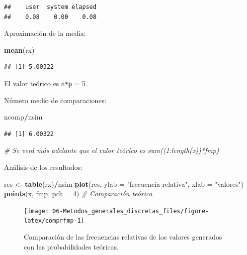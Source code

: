 \documentclass[]{book}
\newenvironment{Shaded}{\begin{snugshade}}{\end{snugshade}}
\newcommand{\KeywordTok}[1]{\textcolor[rgb]{0.13,0.29,0.53}{\textbf{#1}}}
\newcommand{\DataTypeTok}[1]{\textcolor[rgb]{0.13,0.29,0.53}{#1}}
\newcommand{\DecValTok}[1]{\textcolor[rgb]{0.00,0.00,0.81}{#1}}
\newcommand{\StringTok}[1]{\textcolor[rgb]{0.31,0.60,0.02}{#1}}
\newcommand{\CommentTok}[1]{\textcolor[rgb]{0.56,0.35,0.01}{\textit{#1}}}
\newcommand{\OperatorTok}[1]{\textcolor[rgb]{0.81,0.36,0.00}{\textbf{#1}}}
\newcommand{\NormalTok}[1]{#1}
\theoremstyle{definition}
\theoremstyle{definition}
\theoremstyle{definition}
\theoremstyle{remark}
\begin{document}
\begin{verbatim}
##    user  system elapsed 
##    0.08    0.00    0.08
\end{verbatim}

Aproximación de la media:

\begin{Shaded}
\begin{Highlighting}[]
\KeywordTok{mean}\NormalTok{(rx)}
\end{Highlighting}
\end{Shaded}

\begin{verbatim}
## [1] 5.00322
\end{verbatim}

El valor teórico es \texttt{n*p} = 5.

Número medio de comparaciones:

\begin{Shaded}
\begin{Highlighting}[]
\NormalTok{ncomp}\OperatorTok{/}\NormalTok{nsim}
\end{Highlighting}
\end{Shaded}

\begin{verbatim}
## [1] 6.00322
\end{verbatim}

\begin{Shaded}
\begin{Highlighting}[]
\CommentTok{# Se verá más adelante que el valor teórico es sum((1:length(x))*fmp)}
\end{Highlighting}
\end{Shaded}

Análisis de los resultados:

\begin{Shaded}
\begin{Highlighting}[]
\NormalTok{res <-}\StringTok{ }\KeywordTok{table}\NormalTok{(rx)}\OperatorTok{/}\NormalTok{nsim}
\KeywordTok{plot}\NormalTok{(res, }\DataTypeTok{ylab =} \StringTok{"frecuencia relativa"}\NormalTok{, }\DataTypeTok{xlab =} \StringTok{"valores"}\NormalTok{)}
\KeywordTok{points}\NormalTok{(x, fmp, }\DataTypeTok{pch =} \DecValTok{4}\NormalTok{)  }\CommentTok{# Comparación teórica}
\end{Highlighting}
\end{Shaded}

\begin{figure}[!htb]

{\centering \texttt{[image: 06-Metodos\_generales\_discretas\_files/figure-latex/comprfmp-1]} 

}

\caption{Comparación de las frecuencias relativas de los valores generados con las probabilidades teóricas.}\label{fig:comprfmp}
\end{figure}
\end{document}
